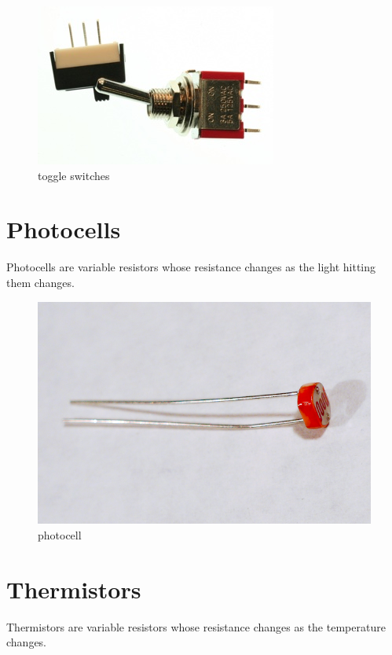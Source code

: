 \begin{figure}[!htb]
     \centering
     \includegraphics[scale=0.3]{img/components/switches_toggle.jpg}
     \caption{toggle switches}
     \label{toggle switches}
\end{figure}

\section{Photocells}

Photocells are variable resistors whose resistance changes as the light hitting them changes.

\begin{figure}[!htb]
     \centering
     \includegraphics[scale=0.3]{img/components/photocell.jpg}
     \caption{photocell}
     \label{photocell}
\end{figure}

\section{Thermistors}

Thermistors are variable resistors whose resistance changes as the temperature changes. 

